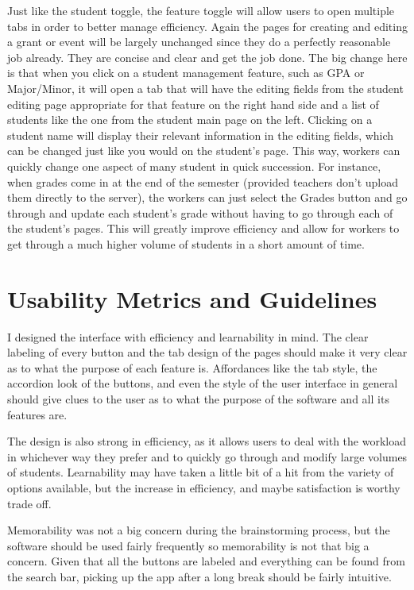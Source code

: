 \documentclass{article}
\begin{document}
Just like the student toggle, the feature toggle will allow users to open multiple tabs in order to better manage efficiency. Again the pages for creating and editing a grant or event will be largely unchanged since they do a perfectly reasonable job already. They are concise and clear and get the job done. The big change here is that when you click on a student management feature, such as GPA or Major/Minor, it will open a tab that will have the editing fields from the student editing page appropriate for that feature on the right hand side and a list of students like the one from the student main page on the left. Clicking on a student name will display their relevant information in the editing fields, which can be changed just like you would on the student's page. This way, workers can quickly change one aspect of many student in quick succession. For instance, when grades come in at the end of the semester (provided teachers don't upload them directly to the server), the workers can just select the Grades button and go through and update each student's grade without having to go through each of the student's pages. This will greatly improve efficiency  and allow for workers to get through a much higher volume of students in a short amount of time. 

\section{Usability Metrics and Guidelines}

I designed the interface with efficiency and learnability in mind.  The clear labeling of every button and the tab design of the pages should make it very clear as to what the purpose of each feature is. Affordances like the tab style, the accordion look of the buttons, and even the style of the user interface in general should give clues to the user as to what the purpose of the software and all its features are. 

The design is also strong in efficiency, as it allows users to deal with the workload in whichever way they prefer and to quickly go through and modify large volumes of students. Learnability may have taken a little bit of a hit from the variety of options available, but the increase in efficiency, and maybe satisfaction is worthy trade off.

Memorability was not a big concern during the brainstorming process, but the software should be used fairly frequently so memorability is not that big a concern. Given that all the buttons are labeled and everything can be found from the search bar, picking up the app after a long break should be fairly intuitive.
\end{document}
